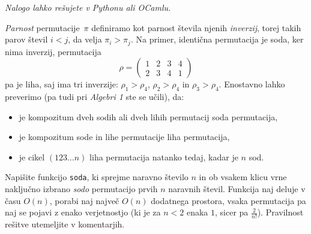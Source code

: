\documentclass[arhiv]{../izpit}
\begin{document}

  \naloga
  
  \emph{Nalogo lahko rešujete v Pythonu ali OCamlu.}

  \emph{Parnost} permutacije~$\pi$ definiramo kot parnost števila njenih \emph{inverzij}, torej takih parov števil $i < j$, da velja $\pi_i > \pi_j$. Na primer, identična permutacija je soda, ker nima inverzij, permutacija
  \[
    \rho = \begin{pmatrix}1 & 2 & 3 & 4 \\ 2 & 3 & 4 & 1 \end{pmatrix}
  \]
  pa je liha, saj ima tri inverzije: $\rho_1 > \rho_4$, $\rho_2 > \rho_4$ in $\rho_3 > \rho_4$. Enostavno lahko preverimo (pa tudi pri \emph{Algebri 1} ste se učili), da:
  \begin{itemize}
    \item je kompozitum dveh sodih ali dveh lihih permutacij soda permutacija,
    \item je kompozitum sode in lihe permutacije liha permutacija,
    \item je cikel $(1 2 3 \dots n)$ liha permutacija natanko tedaj, kadar je $n$ sod.
  \end{itemize}

  Napišite funkcijo \verb|soda|, ki sprejme naravno število $n$ in ob vsakem klicu vrne naključno izbrano \emph{sodo} permutacijo prvih $n$ naravnih števil. Funkcija naj deluje v času $O(n)$, porabi naj največ $O(n)$ dodatnega prostora, vsaka permutacija pa naj se pojavi z enako verjetnostjo (ki je za $n < 2$ enaka $1$, sicer pa $\frac{2}{n!}$). Pravilnost rešitve utemeljite v komentarjih.
\end{document}
